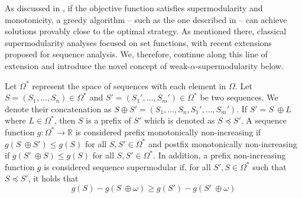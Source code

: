 \documentclass{article} %
\begin{document}
As discussed in , if the objective function satisfies supermodularity and monotonicity, a greedy algorithm -- such as the one described in  -- can achieve solutions provably close to the optimal strategy. As mentioned there, classical supermodularity analyses focused on set functions, with recent extensions proposed for sequence analysis. We, therefore, continue along this line of extension and introduce the novel concept of weak-$\alpha$-supermodularity below.

Let $\Omega^*$ represent the space of sequences with each element in $\Omega$. Let $S = (S_1, \dots, S_n) \in \Omega^*$ and $S' = (S_1', \dots, S_m') \in \Omega^*$ be two sequences. We denote their concatenation as $S \oplus S' = (S_1, \dots, S_n, S_1', \dots, S_m')$. If $S' = S \ \oplus L$ where $L \in \Omega^*$, then $S$ is a prefix of $S'$ which is denoted as $S \preceq S'$. A sequence function $g: \Omega^* \to \mathbb{R}$ is considered prefix monotonically non-increasing if $g(S \ \oplus S') \leq g(S)$ for all $S, S' \in \Omega^*$ and postfix monotonically non-increasing if $g(S' \ \oplus S) \leq g(S)$ for all $S, S' \in \Omega^*$. 
In addition, a prefix non-increasing function $g$ is considered sequence supermodular if, for all $S', S \in \Omega^*$ such that $S \preceq S'$, it holds that
\begin{equation}\label{eqn:supermod}
    g(S) - g(S \ \oplus \omega ) \geq g(S') - g(S' \ \oplus \omega )
\end{equation}
\end{document}
